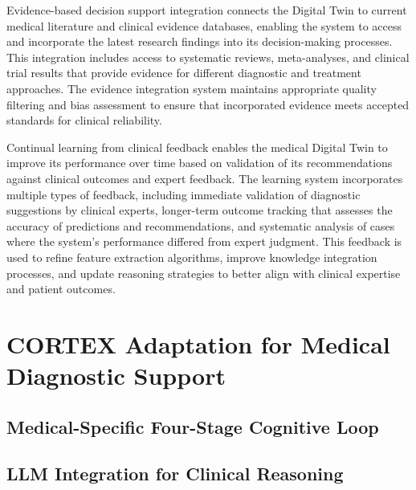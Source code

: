 Evidence-based decision support integration connects the Digital Twin to current medical literature and clinical evidence databases, enabling the system to access and incorporate the latest research findings into its decision-making processes. This integration includes access to systematic reviews, meta-analyses, and clinical trial results that provide evidence for different diagnostic and treatment approaches. The evidence integration system maintains appropriate quality filtering and bias assessment to ensure that incorporated evidence meets accepted standards for clinical reliability.

Continual learning from clinical feedback enables the medical Digital Twin to improve its performance over time based on validation of its recommendations against clinical outcomes and expert feedback. The learning system incorporates multiple types of feedback, including immediate validation of diagnostic suggestions by clinical experts, longer-term outcome tracking that assesses the accuracy of predictions and recommendations, and systematic analysis of cases where the system's performance differed from expert judgment. This feedback is used to refine feature extraction algorithms, improve knowledge integration processes, and update reasoning strategies to better align with clinical expertise and patient outcomes.

\section{CORTEX Adaptation for Medical Diagnostic Support}

\subsection{Medical-Specific Four-Stage Cognitive Loop}

\subsection{LLM Integration for Clinical Reasoning}

